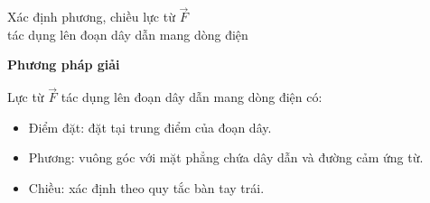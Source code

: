 \begin{dang}{Xác định phương, chiều lực từ $\vec{F}$ \\ tác dụng lên đoạn dây dẫn mang dòng điện}
\end{dang}
\textbf{Phương pháp giải}

Lực từ $\vec{F}$ tác dụng lên đoạn dây dẫn mang dòng điện có:
\begin{itemize}
	\item Điểm đặt: đặt tại trung điểm của đoạn dây.
	\item Phương: vuông góc với mặt phẳng chứa dây dẫn và đường cảm ứng từ.
	\item Chiều: xác định theo quy tắc bàn tay trái.  
\end{itemize}



